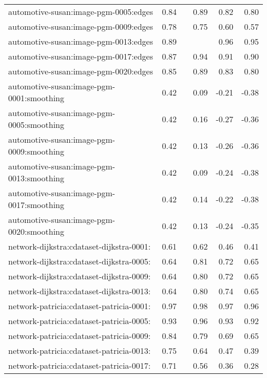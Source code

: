 \begin{longtable}{lrrrrr}
automotive-susan:image-pgm-0005:edges & 0.84 & \color{Green}{0.92} & 0.89 & 0.82 & 0.80 \\
automotive-susan:image-pgm-0009:edges & 0.78 & \color{Green}{0.84} & 0.75 & 0.60 & 0.57 \\
automotive-susan:image-pgm-0013:edges & 0.89 & \color{Green}{0.98} & \color{Green}{0.98} & 0.96 & 0.95 \\
automotive-susan:image-pgm-0017:edges & 0.87 & \color{Green}{0.96} & 0.94 & 0.91 & 0.90 \\
automotive-susan:image-pgm-0020:edges & 0.85 & \color{Green}{0.92} & 0.89 & 0.83 & 0.80 \\
automotive-susan:image-pgm-0001:smoothing & 0.42 & \color{Green}{0.47} & 0.09 & -0.21 & -0.38 \\
automotive-susan:image-pgm-0005:smoothing & 0.42 & \color{Green}{0.46} & 0.16 & -0.27 & -0.36 \\
automotive-susan:image-pgm-0009:smoothing & 0.42 & \color{Green}{0.46} & 0.13 & -0.26 & -0.36 \\
automotive-susan:image-pgm-0013:smoothing & 0.42 & \color{Green}{0.46} & 0.09 & -0.24 & -0.38 \\
automotive-susan:image-pgm-0017:smoothing & 0.42 & \color{Green}{0.46} & 0.14 & -0.22 & -0.38 \\
automotive-susan:image-pgm-0020:smoothing & 0.42 & \color{Green}{0.46} & 0.13 & -0.24 & -0.35 \\
network-dijkstra:cdataset-dijkstra-0001: & 0.61 & \color{Green}{0.74} & 0.62 & 0.46 & 0.41 \\
network-dijkstra:cdataset-dijkstra-0005: & 0.64 & \color{Green}{0.84} & 0.81 & 0.72 & 0.65 \\
network-dijkstra:cdataset-dijkstra-0009: & 0.64 & \color{Green}{0.83} & 0.80 & 0.72 & 0.65 \\
network-dijkstra:cdataset-dijkstra-0013: & 0.64 & \color{Green}{0.84} & 0.80 & 0.74 & 0.65 \\
network-patricia:cdataset-patricia-0001: & 0.97 & \color{Green}{0.99} & 0.98 & 0.97 & 0.96 \\
network-patricia:cdataset-patricia-0005: & 0.93 & \color{Green}{0.97} & 0.96 & 0.93 & 0.92 \\
network-patricia:cdataset-patricia-0009: & 0.84 & \color{Green}{0.87} & 0.79 & 0.69 & 0.65 \\
network-patricia:cdataset-patricia-0013: & 0.75 & \color{Green}{0.78} & 0.64 & 0.47 & 0.39 \\
network-patricia:cdataset-patricia-0017: & 0.71 & \color{Green}{0.74} & 0.56 & 0.36 & 0.28 \\

\end{longtable}
